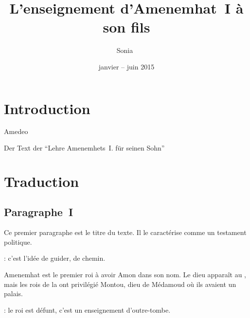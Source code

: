 \documentclass[%
  ngerman, %
  dvipsnames, %
  svgnames, %
  a4paper, %
  twoside, %
  10pt, %
  openany, %
  article, %
]{memoir}
\title{L'enseignement \mbox{d'Amenemhat~I\ier} à son fils}
\subtitle{}
\author{Sonia~\bsc{Labetoulle}}
\date{janvier -- juin 2015}
\newcommand{\DirUtils}{../../../utils}
\begin{document}


\thispagestyle{empty}
\maketitle

\TextHieroglyphs

\frontmatter
\tableofcontents*

\mainmatter


\chapter[Introduction]{\protect{}Introduction}

Amedeo~

\foreignlanguage{ngerman}{Der Text der "`Lehre Amenemhets~I. für 
seinen Sohn"'}


\chapter{Traduction}

\section{Paragraphe~I}

Ce premier paragraphe est le titre du texte. Il le caractérise comme 
un testament politique.

\begin{hierobox}



  \tcblower

   : c'est l'idée de guider, de chemin.
\end{hierobox}

\begin{hierobox}

  \tg{}


  \tcblower

  Amenemhat est le premier roi à avoir Amon dans son nom. Le dieu 
  apparaît au \MK, mais les rois de la  ont privilégié Montou, 
  dieu de Médamoud où ils avaient un palais.

   : le roi est défunt, c'est un enseignement 
  d'outre-tombe.
\end{hierobox}
\end{document}
